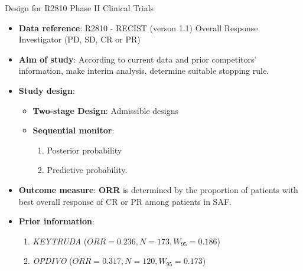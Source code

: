 \begin{frame}{Design for R2810 Phase II Clinical Trials}

\begin{itemize}[<+->]
\tightlist
\item
  \textbf{Data reference}: R2810 - RECIST (verson 1.1) Overall Response
  Investigator (PD, SD, CR or PR)
\item
  \textbf{Aim of study}: According to current data and prior
  competitors' information, make interim analysis, determine suitable
  stopping rule.
\item
  \textbf{Study design}:

  \begin{itemize}[<+->]
  \tightlist
  \item
    \textbf{Two-stage Design}: Admissible designs
  \item
    \textbf{Sequential monitor}:

    \begin{enumerate}[<+->]
    \def\labelenumi{\arabic{enumi}.}
    \tightlist
    \item
      Posterior probability
    \item
      Predictive probability.
    \end{enumerate}
  \end{itemize}
\item
  \textbf{Outcome measure}: \textbf{ORR} is determined by the proportion
  of patients with best overall response of CR or PR among patients in
  SAF.
\item
  \textbf{Prior information}:

  \begin{enumerate}[<+->]
  \def\labelenumi{\arabic{enumi}.}
  \tightlist
  \item
    \emph{KEYTRUDA} (\(ORR=0.236, N=173, W_{95}=0.186\))
  \item
    \emph{OPDIVO} (\(ORR=0.317, N=120, W_{95}=0.173\))
  \end{enumerate}
\end{itemize}

\end{frame}

